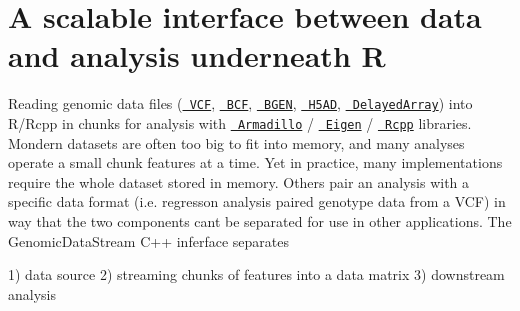 \chapter{A scalable interface between data and analysis underneath R}
\hypertarget{index}{}\label{index}
  Reading genomic data files (\href{https://www.ebi.ac.uk/training/online/courses/human-genetic-variation-introduction/variant-identification-and-analysis/understanding-vcf-format/}{\texttt{ VCF}}, \href{https://samtools.github.io/bcftools/howtos/index.html}{\texttt{ BCF}}, \href{https://www.chg.ox.ac.uk/~gav/bgen_format/index.html}{\texttt{ BGEN}}, \href{https://anndata.readthedocs.io/en/latest/index.html}{\texttt{ H5\+AD}}, \href{https://bioconductor.org/packages/DelayedArray}{\texttt{ Delayed\+Array}}) into R/\+Rcpp in chunks for analysis with \href{https://doi.org/10.21105/joss.00026}{\texttt{ Armadillo}} / \href{eigen.tuxfamily.org}{\texttt{ Eigen}} / \href{https://www.rcpp.org}{\texttt{ Rcpp}} libraries. Mondern datasets are often too big to fit into memory, and many analyses operate a small chunk features at a time. Yet in practice, many implementations require the whole dataset stored in memory. Others pair an analysis with a specific data format (i.\+e. regresson analysis paired genotype data from a VCF) in way that the two components can\textquotesingle{}t be separated for use in other applications.  The {\ttfamily Genomic\+Data\+Stream} C++ inferface separates

1) data source 2) streaming chunks of features into a data matrix 3) downstream analysis ~\newline
 